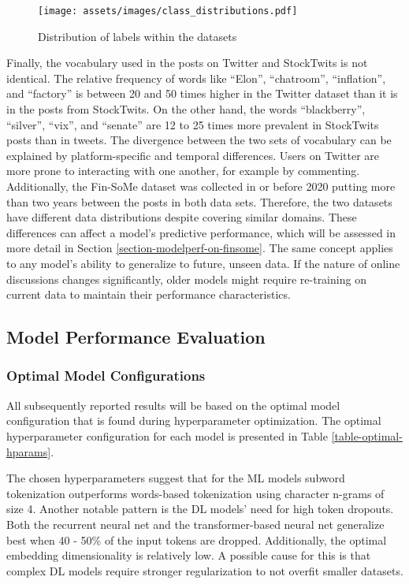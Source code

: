 \begin{figure}[!ht]
	\texttt{[image: assets/images/class\_distributions.pdf]}
	\caption{Distribution of labels within the datasets}
	\label{figure-class-distribution}
\end{figure}

Finally, the vocabulary used in the posts on Twitter and StockTwits is not identical. The relative frequency of words like ``Elon'', ``chatroom'', ``inflation'', and ``factory'' is between 20 and 50 times higher in the Twitter dataset than it is in the posts from StockTwits. On the other hand, the words ``blackberry'', ``silver'', ``vix'', and ``senate'' are 12 to 25 times more prevalent in StockTwits posts than in tweets. The divergence between the two sets of vocabulary can be explained by platform-specific and temporal differences. Users on Twitter are more prone to interacting with one another, for example by commenting. Additionally, the Fin-SoMe dataset was collected in or before 2020 putting more than two years between the posts in both data sets. Therefore, the two datasets have different data distributions despite covering similar domains. These differences can affect a model's predictive performance, which will be assessed in more detail in Section \ref{section-modelperf-on-finsome}. The same concept applies to any model's ability to generalize to future, unseen data. If the nature of online discussions changes significantly, older models might require re-training on current data to maintain their performance characteristics.

\subsection{Model Performance Evaluation}

\subsubsection{Optimal Model Configurations}
All subsequently reported results will be based on the optimal model configuration that is found during hyperparameter optimization.
The optimal hyperparameter configuration for each model is presented in Table \ref{table-optimal-hparams}. 



The chosen hyperparameters suggest that for the ML models subword tokenization outperforms words-based tokenization using character n-grams of size 4. Another notable pattern is the DL models' need for high token dropouts. Both the recurrent neural net and the transformer-based neural net generalize best when 40 - 50\% of the input tokens are dropped. Additionally, the optimal embedding dimensionality is relatively low. A possible cause for this is that complex DL models require stronger regularization to not overfit smaller datasets.




